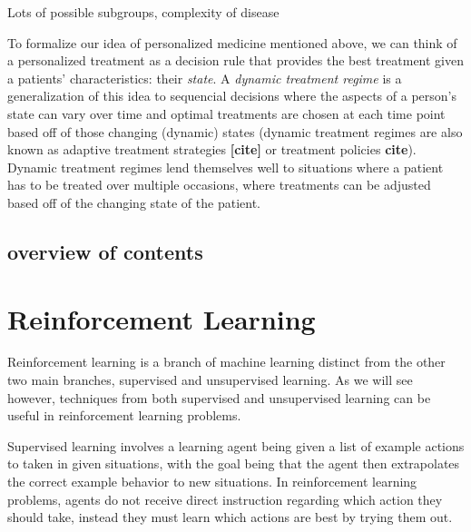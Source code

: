 \documentclass[12pt]{article}
\begin{document}
Lots of possible subgroups, complexity of disease


To formalize our idea of personalized medicine mentioned above, we can think of a personalized treatment as a decision rule that provides the best treatment given a patients' characteristics: their \emph{state}. A \emph{dynamic treatment regime} is a generalization of this idea to sequencial decisions where the aspects of a person's state can vary over time and optimal treatments are chosen at each time point based off of those changing (dynamic) states (dynamic treatment regimes are also known as adaptive treatment strategies \textbf{[cite]} or treatment policies \textbf{cite}). Dynamic treatment regimes lend themselves well to situations where a patient has to be treated over multiple occasions, where treatments can be adjusted based off of the changing state of the patient.



\subsection{overview of contents} %
\label{sub:overview_of_contents_of_thesis}


\section{Reinforcement Learning} %
\label{sec:reinforcement_learning}


Reinforcement learning is a branch of machine learning distinct from the other two main branches, supervised and unsupervised learning. As we will see however, techniques from both supervised and unsupervised learning can be useful in reinforcement learning problems.

Supervised learning involves a learning agent being given a list of example actions to taken in given situations, with the goal being that the agent then extrapolates the correct example behavior to new situations. In reinforcement learning problems, agents do not receive direct instruction regarding which action they should take, instead they must learn which actions are best by trying them out. 
\end{document}
